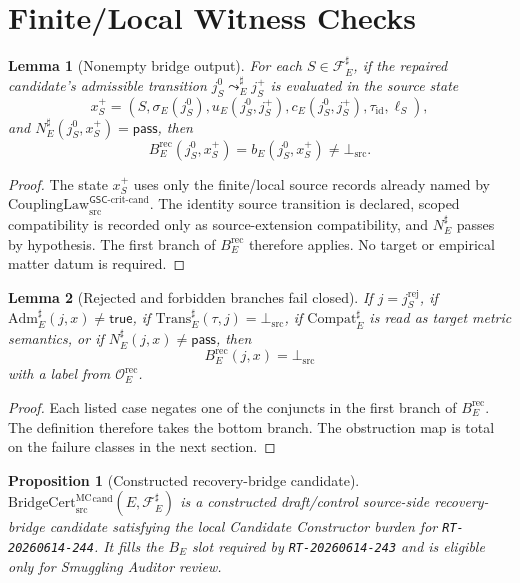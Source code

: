 \documentclass[11pt]{article}
\newcommand{\CouplingLawCrit}{\mathrm{CouplingLaw}^{\mathsf{GSC}\mbox{-}\mathrm{crit}\mbox{-}\mathrm{cand}}_{\mathrm{src}}}
\newcommand{\BridgeCert}{\mathrm{BridgeCert}_{\mathrm{src}}^{\mathrm{MC}}}
\newcommand{\BottomSrc}{\bot_{\mathrm{src}}}
\newcommand{\Adm}{\mathrm{Adm}}
\newcommand{\Trans}{\mathrm{Trans}}
\newcommand{\Compat}{\mathrm{Compat}}
\newtheorem{lemma}{Lemma}
\newtheorem{proposition}{Proposition}
\begin{document}
\section{Finite/Local Witness Checks}

\begin{lemma}[Nonempty bridge output]
For each \(S\in\mathcal{F}_E^\sharp\), if the repaired candidate's admissible
transition \(j_S^0\leadsto_E^\sharp j_S^+\) is evaluated in the source state
\[
  x_S^+=(S,\sigma_E(j_S^0),u_E(j_S^0,j_S^+),c_E(j_S^0,j_S^+),
  \tau_{\mathrm{id}},\ell_S),
\]
and \(N_E^\sharp(j_S^0,x_S^+)=\mathsf{pass}\), then
\[
  B_E^{\mathrm{rec}}(j_S^0,x_S^+) = b_E(j_S^0,x_S^+)
  \neq \BottomSrc .
\]
\end{lemma}

\begin{proof}
The state \(x_S^+\) uses only the finite/local source records already named
by \(\CouplingLawCrit\). The identity source transition is declared, scoped
compatibility is recorded only as source-extension compatibility, and
\(N_E^\sharp\) passes by hypothesis. The first branch of
\(B_E^{\mathrm{rec}}\) therefore applies. No target or empirical matter datum
is required.
\end{proof}

\begin{lemma}[Rejected and forbidden branches fail closed]
If \(j=j_S^{\mathrm{rej}}\), if \(\Adm_E^\sharp(j,x)\neq\mathsf{true}\), if
\(\Trans_E^\sharp(\tau,j)=\BottomSrc\), if \(\Compat_E^\sharp\) is read as
target metric semantics, or if \(N_E^\sharp(j,x)\neq\mathsf{pass}\), then
\[
  B_E^{\mathrm{rec}}(j,x)=\BottomSrc
\]
with a label from \(\mathcal{O}_E^{\mathrm{rec}}\).
\end{lemma}

\begin{proof}
Each listed case negates one of the conjuncts in the first branch of
\(B_E^{\mathrm{rec}}\). The definition therefore takes the bottom branch.
The obstruction map is total on the failure classes in the next section.
\end{proof}

\begin{proposition}[Constructed recovery-bridge candidate]
\(\BridgeCert^{\mathrm{cand}}(E,\mathcal{F}_E^\sharp)\) is a constructed
draft/control source-side recovery-bridge candidate satisfying the local
Candidate Constructor burden for \texttt{RT-20260614-244}. It fills the
\(B_E\) slot required by \texttt{RT-20260614-243} and is eligible only for
Smuggling Auditor review.
\end{proposition}
\end{document}
